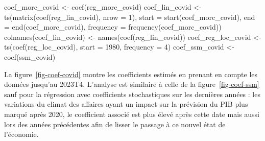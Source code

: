 \documentclass[
  a4paper,
  DIV=11,
  numbers=noendperiod,
  french]{scrartcl}
\newenvironment{Shaded}{\begin{snugshade}}{\end{snugshade}}
\newcommand{\AttributeTok}[1]{\textcolor[rgb]{0.40,0.45,0.13}{#1}}
\newcommand{\DecValTok}[1]{\textcolor[rgb]{0.68,0.00,0.00}{#1}}
\newcommand{\FunctionTok}[1]{\textcolor[rgb]{0.28,0.35,0.67}{#1}}
\newcommand{\NormalTok}[1]{\textcolor[rgb]{0.00,0.23,0.31}{#1}}
\newcommand{\OtherTok}[1]{\textcolor[rgb]{0.00,0.23,0.31}{#1}}
\newcommand\1{{\mathds 1}}
\theoremstyle{remark}
\begin{document}
\begin{Shaded}
\begin{Highlighting}[]
\NormalTok{coef\_morc\_covid }\OtherTok{\textless{}{-}} \FunctionTok{coef}\NormalTok{(reg\_morc\_covid)}
\NormalTok{coef\_lin\_covid }\OtherTok{\textless{}{-}} \FunctionTok{ts}\NormalTok{(}\FunctionTok{matrix}\NormalTok{(}\FunctionTok{coef}\NormalTok{(reg\_lin\_covid), }\AttributeTok{nrow =} \DecValTok{1}\NormalTok{), }
               \AttributeTok{start =} \FunctionTok{start}\NormalTok{(coef\_morc\_covid),}
               \AttributeTok{end =} \FunctionTok{end}\NormalTok{(coef\_morc\_covid),}
               \AttributeTok{frequency =} \FunctionTok{frequency}\NormalTok{(coef\_morc\_covid))}
\FunctionTok{colnames}\NormalTok{(coef\_lin\_covid) }\OtherTok{\textless{}{-}} \FunctionTok{names}\NormalTok{(}\FunctionTok{coef}\NormalTok{(reg\_lin\_covid))}
\NormalTok{coef\_reg\_loc\_covid }\OtherTok{\textless{}{-}} \FunctionTok{ts}\NormalTok{(}\FunctionTok{coef}\NormalTok{(reg\_loc\_covid), }\AttributeTok{start =} \DecValTok{1980}\NormalTok{, }\AttributeTok{frequency =} \DecValTok{4}\NormalTok{)}
\NormalTok{coef\_ssm\_covid }\OtherTok{\textless{}{-}} \FunctionTok{coef}\NormalTok{(ssm\_covid)}
\end{Highlighting}
\end{Shaded}

La figure~\ref{fig-coef-covid} montre les coefficients estimés en
prenant en compte les données jusqu'au 2023T4. L'analyse est similaire à
celle de la figure~\ref{fig-coef-ssm} sauf pour la régression avec
coefficients stochastiques sur les dernières années : les variations du
climat des affaires ayant un impact sur la prévision du PIB plus marqué
après 2020, le coefficient associé est plus élevé après cette date mais
aussi lors des années précédentes afin de lisser le passage à ce nouvel
état de l'économie.
\end{document}
